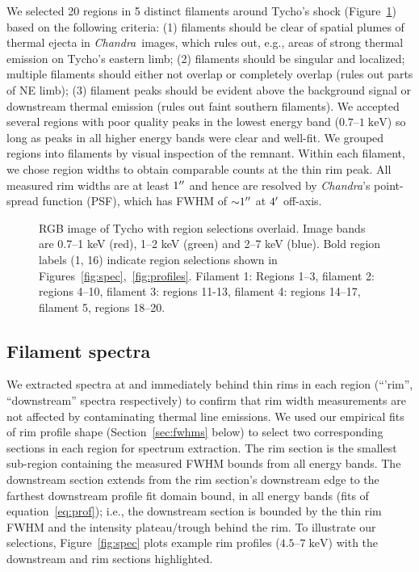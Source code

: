 \documentclass[iop, apj, numberedappendix]{emulateapj}
\newcommand*{\mt}{\mathrm}
\newcommand*{\unit}[1]{\;\mt{#1}}  %
\newcommand*{\abt}{\mathord{\sim}} %
\newcommand*{\Chandra}{\textit{Chandra}\ }
\begin{document}
We selected 20 regions in 5 distinct filaments around Tycho's shock
(Figure~\ref{fig:snr}) based on the following criteria: (1) filaments should be
clear of spatial plumes of thermal ejecta in \Chandra images, which rules out,
e.g., areas of strong thermal emission on Tycho's eastern limb; (2) filaments
should be singular and localized; multiple filaments should either not
overlap or completely overlap (rules out parts of NE limb); (3) filament
peaks should be evident above the background signal or downstream thermal
emission (rules out faint southern filaments).  We accepted several
regions with poor quality peaks in the lowest energy band ($0.7$--$1
\unit{keV}$) so long as peaks in all higher energy bands were clear and
well-fit.  We grouped regions into filaments by visual inspection of the
remnant.  Within each filament, we chose region widths to obtain comparable
counts at the thin rim peak.  All measured rim widths are at least $1\mbox{$^{\prime\prime}$}$
and hence are resolved by \textit{Chandra}'s point-spread function (PSF), which
has FWHM of $\abt 1\arcsec$ at $4\mbox{$^\prime$}$ off-axis.

\begin{figure}
    \centering
    \iftoggle{manuscript}{
    }{
        \plotone{figures/snr.pdf}
    }
    \caption{RGB image of Tycho with region selections overlaid.  Image bands
    are 0.7--1 keV (red), 1--2 keV (green) and 2--7 keV (blue).  Bold region
    labels (1, 16) indicate region selections shown in
    Figures~\ref{fig:spec},~\ref{fig:profiles}.  Filament 1: Regions 1--3,
    filament 2: regions 4--10, filament 3: regions 11-13, filament 4:
    regions 14--17, filament 5, regions 18--20.
    \label{fig:snr}}
\end{figure}

\subsection{Filament spectra}
\label{sec:spec}

We extracted spectra at and immediately behind thin rims in each region
(``'rim'', ``downstream'' spectra respectively) to confirm that rim width
measurements are not affected by contaminating thermal line emissions.  We
used our empirical fits of rim profile shape (Section~\ref{sec:fwhms} below)
to select two corresponding sections in each region for spectrum extraction.
The rim section is the smallest sub-region containing the measured FWHM bounds
from all energy bands.  The downstream section extends from the rim section's
downstream edge to the farthest downstream profile fit domain bound, in all
energy bands (fits of equation~\eqref{eq:prof}); i.e., the downstream section
is bounded by the thin rim FWHM and the intensity plateau/trough behind the
rim.  To illustrate our selections, Figure~\ref{fig:spec} plots example rim
profiles ($4.5$--$7 \unit{keV}$) with the downstream and rim sections
highlighted.
\end{document}
